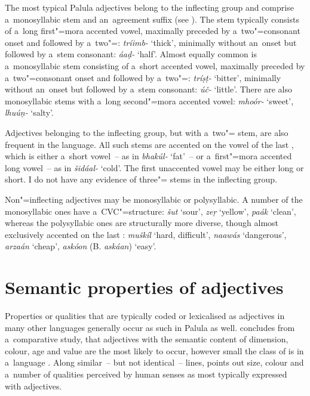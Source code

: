 The most typical Palula adjectives belong to the inflecting group and comprise a~monosyllabic stem and an~agreement suffix (see ). The stem typically consists of a~long first"=mora accented vowel, maximally preceded by a~two"=consonant onset and followed by a~two"=: \textit{tríimb-} `thick', minimally without an~onset but followed by a~stem consonant: \textit{áaḍ-} `half'. Almost equally common is a~monosyllabic stem consisting of a~short accented vowel, maximally preceded by a~two"=consonant onset and followed by a~two"=: \textit{tríṣṭ-} `bitter', minimally without an~onset but followed by a~stem consonant: \textit{úč-} `little'. There are also monosyllabic stems with a~long second"=mora accented vowel: \textit{mhoór-} `sweet', \textit{lhuúṇ-} `salty'. 


Adjectives belonging to the inflecting group, but with a~two"= stem, are also frequent in the language. All such stems are accented on the vowel of the last , which is either a~short vowel~-- as in \textit{bhakúl-} `fat'~-- or a~first"=mora accented long vowel~-- as in \textit{šidáal-} `cold'. The first unaccented vowel may be either long or short. I do not have any evidence of three"=  stems in the inflecting group.


Non"=inflecting adjectives may be monosyllabic or polysyllabic. A number of the monosyllabic ones have a~CVC"=structure: \textit{šut} `sour', \textit{zeṛ} `yellow', \textit{paák} `clean', whereas the polysyllabic ones are structurally more diverse, though almost exclusively accented on the last : \textit{muškíl} `hard, difficult', \textit{naawás} `dangerous', \textit{arzaán} `cheap', \textit{askóon} (B. \textit{askáan}) `easy'. 


\section{Semantic properties of adjectives}
\label{sec:6-2}

Properties or qualities that are typically coded or lexicalised as adjectives in many other languages generally occur as such in Palula as well. \citeauthor{dixon1982} concludes from a~comparative study, that adjectives with the semantic content of dimension, colour, age and value are the most likely to occur, however small the class of  is in a~language \citep[46]{dixon1982}. Along similar~-- but not identical~-- lines, \citet[82]{givon2001a} points out size, colour and a~number of qualities perceived by human senses as most typically expressed with adjectives. 



